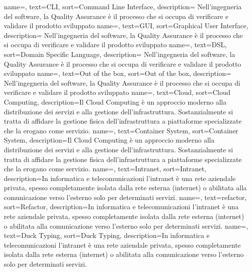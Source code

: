 {
	name=,
	text=CLI,
	sort=Command Line Interface,
	description={ Nell'ingegneria del software, la Quality Assurance è il processo che si occupa di verificare e validare il prodotto sviluppato}
}
{
	name=,
	text=GUI,
	sort=Graphical User Interface,
	description={ Nell'ingegneria del software, la Quality Assurance è il processo che si occupa di verificare e validare il prodotto sviluppato}
}
{
	name=,
	text=DSL,
	sort=Domain Specific Language,
	description={ Nell'ingegneria del software, la Quality Assurance è il processo che si occupa di verificare e validare il prodotto sviluppato}
}
{
	name=,
	text=Out of the box,
	sort=Out of the box,
	description={ Nell'ingegneria del software, la Quality Assurance è il processo che si occupa di verificare e validare il prodotto sviluppato}
}
{
	name=,
	text=Cloud,
	sort=Cloud Computing,
	description={Il Cloud Computing è un approccio moderno alla distribuzione dei servizi e alla gestione dell’infrastruttura. Sostanzialmente si tratta di affidare la gestione fisica dell’infrastruttura a piattaforme specializzate che la erogano come servizio.}
}
{
	name=,
	text=Container System,
	sort=Container System,
	description={Il Cloud Computing è un approccio moderno alla distribuzione dei servizi e alla gestione dell’infrastruttura. Sostanzialmente si tratta di affidare la gestione fisica dell’infrastruttura a piattaforme specializzate che la erogano come servizio.}
}
{
	name=,
	text=Intranet,
	sort=Intranet,
	description={In informatica e telecomunicazioni l'intranet è una rete aziendale privata, spesso completamente isolata dalla rete esterna (internet) o abilitata alla comunicazione verso l'esterno solo per determinati servizi.}
}
{
	name=,
	text=refactor,
	sort=Refactor,
	description={In informatica e telecomunicazioni l'intranet è una rete aziendale privata, spesso completamente isolata dalla rete esterna (internet) o abilitata alla comunicazione verso l'esterno solo per determinati servizi.}
}
{
	name=,
	text=Duck Typing,
	sort=Duck Typing,
	description={In informatica e telecomunicazioni l'intranet è una rete aziendale privata, spesso completamente isolata dalla rete esterna (internet) o abilitata alla comunicazione verso l'esterno solo per determinati servizi.}
}
